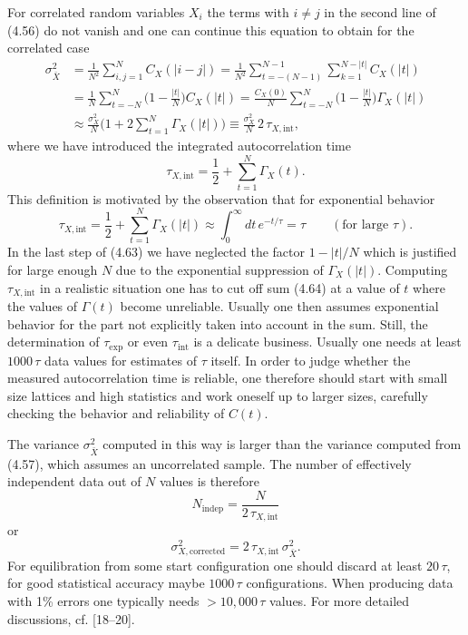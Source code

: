 For correlated random variables $X_i$ the terms with $i \neq j$ in the second line
of (4.56) do not vanish and one can continue this equation to obtain for the
correlated case
\begin{equation}
  \begin{split}
    \sigma_{\bar{X}}^2 &= \frac{1}{N^2}\sum_{i,j=1}^{N} C_X(|i-j|)
    = \frac{1}{N^2}\sum_{t=-(N-1)}^{N-1}\sum_{k=1}^{N-|t|} C_X(|t|) \\
    &= \frac{1}{N}\sum_{t=-N}^{N}\Big(1-\frac{|t|}{N}\Big)C_X(|t|)
    = \frac{C_X(0)}{N}\sum_{t=-N}^{N}\Big(1-\frac{|t|}{N}\Big)\Gamma_X(|t|) \\
    &\approx \frac{\sigma_X^2}{N}\Big(1 + 2\sum_{t=1}^{N}\Gamma_X(|t|)\Big)
    \equiv \frac{\sigma_X^2}{N}\,2\,\tau_{X,\mathrm{int}},
  \end{split}
\end{equation}
where we have introduced the integrated autocorrelation time
\begin{equation}
  \tau_{X,\mathrm{int}} = \frac{1}{2} + \sum_{t=1}^{N}\Gamma_X(t) .
\end{equation}
This definition is motivated by the observation that for exponential behavior
\begin{equation}
  \tau_{X,\mathrm{int}} = \frac{1}{2} + \sum_{t=1}^{N}\Gamma_X(|t|)
  \approx \int_0^{\infty} dt\,e^{-t/\tau} = \tau \qquad (\text{for large } \tau) .
\end{equation}
In the last step of (4.63) we have neglected the factor $1 - |t|/N$ which is
justified for large enough $N$ due to the exponential suppression of $\Gamma_X(|t|)$.
Computing $\tau_{X,\mathrm{int}}$ in a realistic situation one has to cut off sum (4.64) at
a value of $t$ where the values of $\Gamma(t)$ become unreliable. Usually one then
assumes exponential behavior for the part not explicitly taken into account
in the sum. Still, the determination of $\tau_\mathrm{exp}$ or even $\tau_\mathrm{int}$ is a delicate business.
Usually one needs at least $1000\,\tau$ data values for estimates of $\tau$ itself. In order
to judge whether the measured autocorrelation time is reliable, one therefore
should start with small size lattices and high statistics and work oneself up
to larger sizes, carefully checking the behavior and reliability of $C(t)$.

The variance $\sigma_{\bar{X}}^2$ computed in this way is larger than the variance computed from (4.57), which assumes an uncorrelated sample. The number of
effectively independent data out of $N$ values is therefore
\begin{equation}
  N_\mathrm{indep} = \frac{N}{2\,\tau_{X,\mathrm{int}}}
\end{equation}
or
\begin{equation}
  \sigma_{X,\mathrm{corrected}}^2 = 2\,\tau_{X,\mathrm{int}}\,\sigma_{\bar{X}}^2 .
\end{equation}
For equilibration from some start configuration one should discard at least
$20\,\tau$, for good statistical accuracy maybe $1000\,\tau$ configurations. When producing data with 1\% errors one typically needs $> 10{,}000\,\tau$ values. For more
detailed discussions, cf. [18--20].

